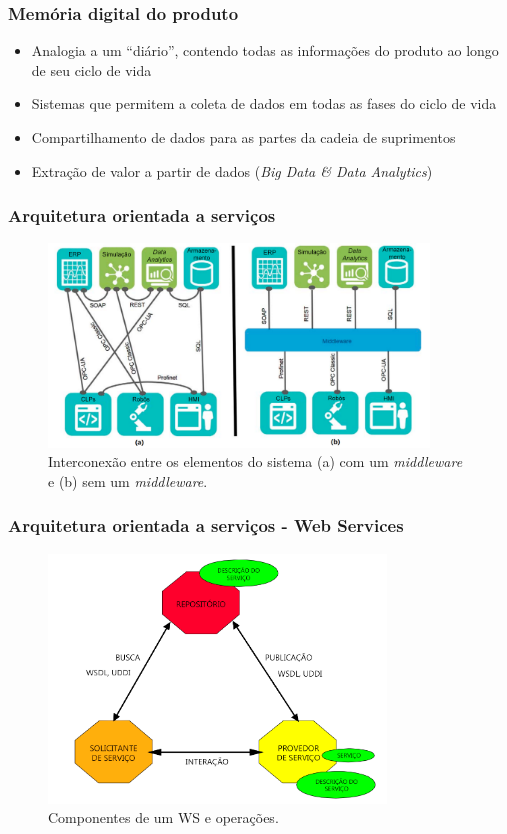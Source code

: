 \documentclass[10pt]{beamer}
\begin{document}
\begin{frame}
	\frametitle{Memória digital do produto} 
	
	\begin{itemize}
		\item Analogia a um ``diário'', contendo todas as informações do produto ao longo de seu ciclo de vida
		\item Sistemas que permitem a coleta de dados em todas as fases do ciclo de vida
		\item Compartilhamento de dados para as partes da cadeia de suprimentos
		\item Extração de valor a partir de dados (\textit{Big Data \& Data Analytics})
	\end{itemize}
	
\end{frame}
\begin{frame}
	\frametitle{Arquitetura orientada a serviços} 
	
	\begin{figure}[htb]
		\centering
		\caption{Interconexão entre os elementos do sistema (a) com um \textit{middleware} e (b) sem um \textit{middleware}.}
		\label{fig:middleware}
		\includegraphics[width=0.9\textwidth]{middleware.png}
	\end{figure}
	
\end{frame}
\begin{frame}
	\frametitle{Arquitetura orientada a serviços - Web Services} 
	
	\begin{figure}[htb]
		\centering
		\caption{Componentes de um WS e operações.}
		\label{fig:webservice-componentes}
		\includegraphics[width=0.8\textwidth]{webservice-componentes}
	\end{figure}
	
\end{frame}
\end{document}

